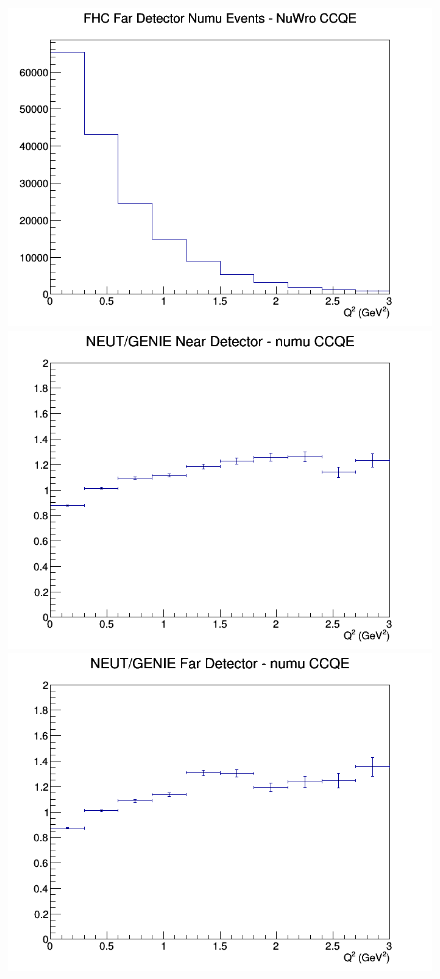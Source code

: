 \begin{figure}[h]
\endminipage
{}
\includegraphics[width=\linewidth]{Q2/nominal/CCQE_FHC_FD_numu_Q2_NuWro.png}
\endminipage
\newline
{}
\includegraphics[width=\linewidth]{Q2/nominal/ratios/CCQE_NEUT_GENIE_numu_near_Q2.png}
\endminipage
{}
\includegraphics[width=\linewidth]{Q2/nominal/ratios/CCQE_NEUT_GENIE_numu_far_Q2.png}

\end{figure}
